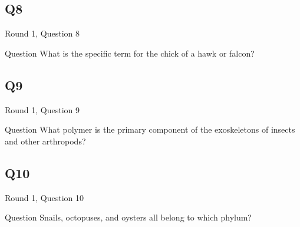 \documentclass[11pt]{beamer}
\begin{document}
\subsection*{Q8}
\begin{frame}[t]{Round 1, Question 8}
\begin{block}{Question}
What is the specific term for the chick of a hawk or falcon?
\end{block}
\end{frame}
\subsection*{Q9}
\begin{frame}[t]{Round 1, Question 9}
\begin{block}{Question}
What polymer is the primary component of the exoskeletons of insects and other arthropods?
\end{block}
\end{frame}
\subsection*{Q10}
\begin{frame}[t]{Round 1, Question 10}
\begin{block}{Question}
Snails, octopuses, and oysters all belong to which phylum?
\end{block}
\end{frame}
\end{document}

